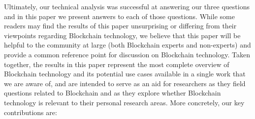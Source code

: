 

Ultimately, our technical analysis was successful at answering our three questions and in this paper we present answers to each of those questions.
While some readers may find the results of this paper unsurprising or differing from their viewpoints regarding Blockchain technology, we believe that this paper will be helpful to the community at large (both Blockchain experts and non-experts) and provide a common reference point for discussion on Blockchain technology.
Taken together, the results in this paper represent the most complete overview of Blockchain technology and its potential use cases available in a single work that we are aware of, and are intended to serve as an aid for researchers as they field questions related to Blockchain and as they explore whether Blockchain technology is relevant to their personal research areas.
More concretely, our key contributions are:

